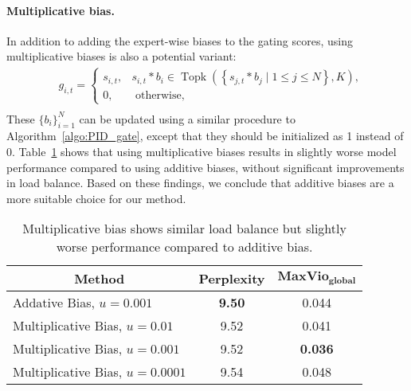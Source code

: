 \documentclass{article} %
\begin{document}
\paragraph{Multiplicative bias.}
In addition to adding the expert-wise biases to the gating scores, using multiplicative biases is also a potential variant:
\begin{equation}
\label{eq:pid_gate_bias}
\begin{aligned}
& g_{i, t}= \begin{cases}s_{i, t}, & s_{i, t}  * {b}_i \in \operatorname{Topk}\left(\left\{s_{j, t}  * {b}_j\mid 1 \leq j \leq N\right\}, K\right), \\
0, & \text { otherwise, }\end{cases} \\
\end{aligned} 
\end{equation}
These $\{{b}_i\}_{i=1}^N$ can be updated using a similar procedure to Algorithm~\ref{algo:PID_gate}, except that they should be initialized as 1 instead of 0. 
Table~\ref{tab:multiplicative bias} shows that using multiplicative biases results in slightly worse model performance compared to using additive biases, without significant improvements in load balance.
Based on these findings, we conclude that additive biases are a more suitable choice for our method.


\begin{table}[t]
\caption{Multiplicative bias shows similar load balance but slightly worse performance compared to additive bias.}
\label{tab:multiplicative bias}
\begin{center}
\begin{tabular}{l|c|c}
\toprule
\multicolumn{1}{c|}{\textbf{Method}} & \textbf{Perplexity} & $\textbf{MaxVio}_\textbf{global}$ \\
\midrule
Addative Bias, $u=0.001$ & \textbf{9.50} & 0.044 \\
Multiplicative Bias, $u=0.01$ & 9.52 & 0.041 \\ 
Multiplicative Bias, $u=0.001$ &  9.52 & \textbf{0.036} \\
Multiplicative Bias, $u=0.0001$ & 9.54  & 0.048 \\
\bottomrule
\end{tabular}
\end{center}
\end{table}
\end{document}
